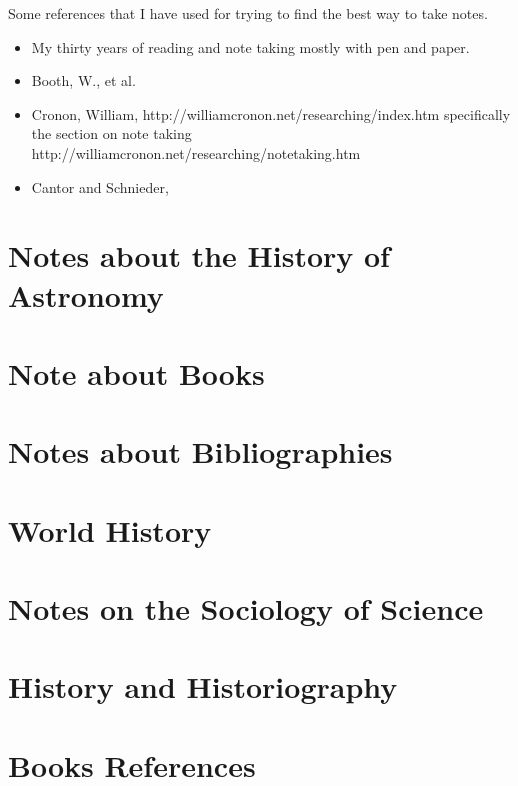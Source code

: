 \documentclass{article}
\begin{document}
Some references that I have used for trying to find the best way to take
notes.
\begin{itemize}
\item My thirty years of reading and note taking mostly with pen and  paper.
\item Booth, W., et al.\ 
  \cite{Booth2008}
\item Cronon, William, 
  http://williamcronon.net/researching/index.htm specifically the
  section on note taking
  http://williamcronon.net/researching/notetaking.htm
  \cite{Cronon2008}
\item Cantor and Schnieder,  \cite{Cantor1967}
\end{itemize}


\section{Notes about the History of Astronomy}


\section{Note about Books}


\section{Notes about Bibliographies}


\section{World History}


%

\section{Notes on the Sociology of Science}


\section{History and Historiography}


\section{Books References}


\vfil\eject

\printbibliography
\end{document}
